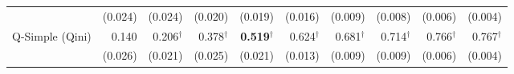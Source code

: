 \documentclass{article}
\begin{document}
\begin{table}[H]
\begin{tabular}{l|rrrrrrrrr}
 & \scriptsize (0.024) & \scriptsize (0.024) & \scriptsize (0.020) & \scriptsize (0.019) & \scriptsize (0.016) & \scriptsize (0.009) & \scriptsize (0.008) & \scriptsize (0.006) & \scriptsize (0.004) \\[2pt]
Q-Simple (Qini) & 0.140 & 0.206$^\dagger$ & 0.378$^\dagger$ & \textbf{0.519}$^\dagger$ & 0.624$^\dagger$ & 0.681$^\dagger$ & 0.714$^\dagger$ & 0.766$^\dagger$ & 0.767$^\dagger$ \\
 & \scriptsize (0.026) & \scriptsize (0.021) & \scriptsize (0.025) & \scriptsize (0.021) & \scriptsize (0.013) & \scriptsize (0.009) & \scriptsize (0.009) & \scriptsize (0.006) & \scriptsize (0.004) \\[2pt]
\hline
\end{tabular}
\end{table}
\end{document}
